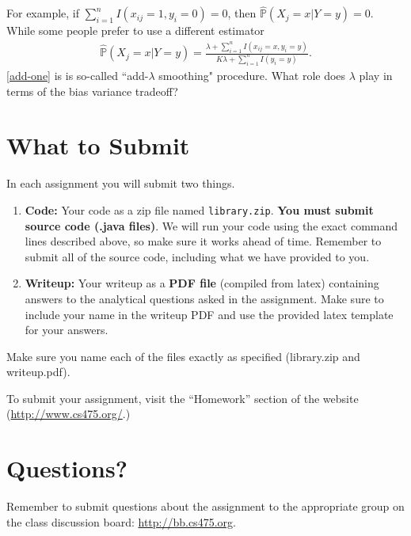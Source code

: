 \documentclass[11pt]{article}
\begin{document}
For example, if $\sum_{i=1}^nI(x_{ij}=1,y_i=0)=0$, then $\hat{\mathbb{P}}(X_j=x|Y=y) = 0$. While some people prefer to use a different estimator
\begin{align}\label{add-one}
\hat{\mathbb{P}}(X_j=x|Y=y) = \frac{\lambda+\sum_{i=1}^nI(x_{ij}=x,y_i=y)}{K\lambda+\sum_{i=1}^nI(y_i=y)}.
\end{align}
\eqref{add-one} is is so-called ``add-$\lambda$ smoothing" procedure. What role does $\lambda$ play in terms of the bias variance tradeoff? 



\section{What to Submit}
In each assignment you will submit two things.
\begin{enumerate}
\item {\bf Code:} Your code as a zip file named {\tt library.zip}. {\bf You must submit source code (.java files)}. We will run your code using the exact command lines described above, so make sure it works ahead of time. Remember to submit all of the source code, including what we have provided to you.
\item {\bf Writeup:} Your writeup as a {\bf PDF file} (compiled from latex) containing answers to the analytical questions asked in the assignment. Make sure to include your name in the writeup PDF and use the provided latex template for your answers.
\end{enumerate}
Make sure you name each of the files exactly as specified (library.zip and writeup.pdf).

To submit your assignment, visit the ``Homework'' section of the website (\href{http://www.cs475.org/}{http://www.cs475.org/}.)

\section{Questions?}
Remember to submit questions about the assignment to the appropriate group on the class discussion board: \href{http://bb.cs475.org/}{http://bb.cs475.org}.
\end{document}
